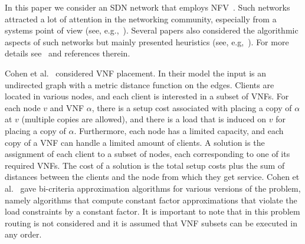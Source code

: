 \documentclass[11pt]{article}
\begin{document}
In this paper we consider an SDN network that employs
NFV~\cite{SDN-NFV15}.  Such networks attracted a lot of attention in
the networking community, especially from a systems point of view
(see, e.g.,~\cite{GVPGKDA14,HVSBFTF15}).  Several papers also
considered the algorithmic aspects of such networks but mainly
presented heuristics (see, e.g,~\cite{soule2014merlin}).  For more
details see~\cite{ERS16} and references therein.

Cohen et al.~\cite{CLNR15} considered VNF placement.  In their model
the input is an undirected graph with a metric distance function on
the edges.  Clients are located in various nodes, and each client is
interested in a subset of VNFs.  For each node $v$ and VNF $\alpha$,
there is a setup cost associated with placing a copy of $\alpha$ at
$v$ (multiple copies are allowed), and there is a load that is induced
on $v$ for placing a copy of $\alpha$.  Furthermore, each node has a
limited capacity, and each copy of a VNF can handle a limited amount
of clients.  A solution is the assignment of each client to a subset
of nodes, each corresponding to one of its required VNFs.  The cost of
a solution is the total setup costs plus the sum of distances between
the clients and the node from which they get service.
%
Cohen et al.~\cite{CLNR15} gave bi-criteria approximation algorithms
for various versions of the problem, namely algorithms that compute
constant factor approximations that violate the load constraints by a
constant factor.
%
It is important to note that in this problem routing is not considered
and it is assumed that VNF subsets can be executed in any order.
\end{document}
